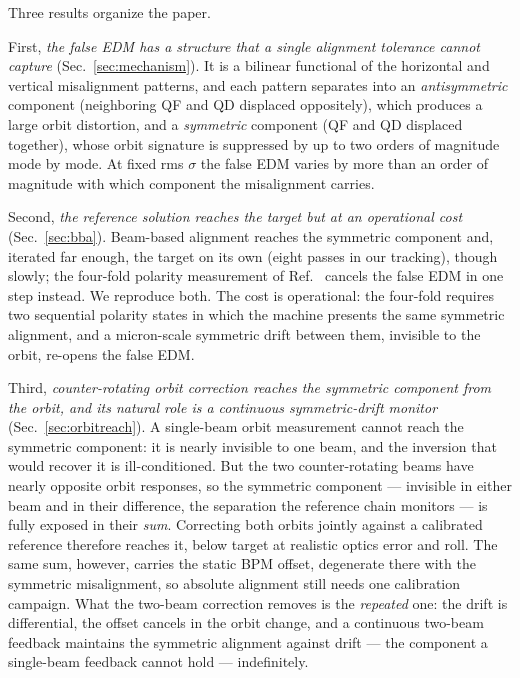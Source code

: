 \documentclass[aps,prab,reprint,superscriptaddress,nofootinbib]{revtex4-2}
\begin{document}
Three results organize the paper.

First, \emph{the false EDM has a structure that a single alignment tolerance
cannot capture} (Sec.~\ref{sec:mechanism}).  It is a bilinear functional of the
horizontal and vertical misalignment patterns, and each pattern separates into
an \emph{antisymmetric} component (neighboring QF and QD displaced oppositely),
which produces a large orbit distortion, and a \emph{symmetric} component (QF
and QD displaced together), whose orbit signature is suppressed by up to two
orders of magnitude mode by mode.  At fixed rms $\sigma$ the false EDM varies by
more than an order of magnitude with which component the misalignment carries.

Second, \emph{the reference solution reaches the target but at an operational
cost} (Sec.~\ref{sec:bba}).  Beam-based alignment reaches the symmetric
component and, iterated far enough, the target on its own (eight passes in our
tracking), though slowly; the four-fold polarity measurement of
Ref.~\cite{omarov} cancels the false EDM in one step instead.  We reproduce
both.  The cost is operational: the four-fold requires two
sequential polarity states in which the machine presents the same symmetric
alignment, and a micron-scale symmetric drift between them, invisible to the
orbit, re-opens the false EDM.

Third, \emph{counter-rotating orbit correction reaches the symmetric component
from the orbit, and its natural role is a continuous symmetric-drift monitor}
(Sec.~\ref{sec:orbitreach}).  A single-beam orbit measurement cannot reach the
symmetric component: it is nearly invisible to one beam, and the inversion that
would recover it is ill-conditioned.  But the two counter-rotating beams have
nearly opposite orbit responses, so the symmetric component --- invisible in
either beam and in their difference, the separation the reference chain monitors
--- is fully exposed in their \emph{sum}.  Correcting both orbits jointly against
a calibrated reference therefore reaches it, below target at realistic optics
error and roll.  The same sum, however, carries the static BPM offset, degenerate
there with the symmetric misalignment, so absolute alignment still needs one
calibration campaign.  What the two-beam correction removes is the \emph{repeated}
one: the drift is differential, the offset cancels in the orbit change, and a
continuous two-beam feedback maintains the symmetric alignment against drift ---
the component a single-beam feedback cannot hold --- indefinitely.
\end{document}
